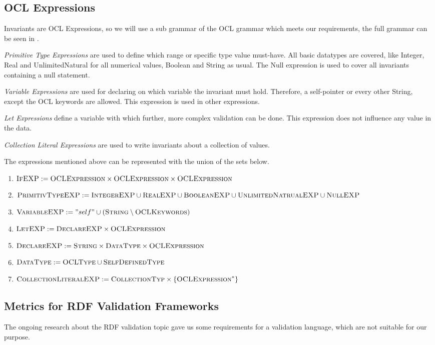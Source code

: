 \documentclass[runningheads]{llncs}
\begin{document}
\subsection{OCL Expressions}\label{OCLINVSubSet}
Invariants are OCL Expressions, so we will use a sub grammar of the OCL grammar which meets our requirements, the full grammar can be seen in \cite{ocl24}.

\textit{Primitive Type Expressions} are used to define which range or specific type value must-have.
All basic datatypes are covered, like Integer, Real and UnlimitedNatural for all numerical values, Boolean and String as usual.
The Null expression is used to cover all invariants containing a null statement.

\textit{Variable Expressions} are used for declaring on which variable the invariant must hold.
Therefore, a self-pointer or every other String, except the OCL keywords are allowed.
This expression is used in other expressions.

\textit{Let Expressions} define a variable with which further, more complex validation can be done.
This expression does not influence any value in the data.

\textit{Collection Literal Expressions} are used to write invariants about a collection of values.

The expressions mentioned above can be represented with the union of the sets below.
\begin{enumerate}
    \item \(\textsc{IfEXP}:=\textsc{OCLExpression} \times \textsc{OCLExpression} \times \textsc{OCLExpression}\)
    \item \(\textsc{PrimitivTypeEXP}:= \textsc{IntegerEXP} \cup \textsc{RealEXP} \cup \textsc{BooleanEXP} \cup \textsc{UnlimitedNatrualEXP} \cup \textsc{NullEXP} \)
    \item \(\textsc{VariableEXP}:="self" \cup (\textsc{String}\setminus\textsc{OCLKeywords})\)
    \item \(\textsc{LetEXP}:=\textsc{DeclareEXP} \times \textsc{OCLExpression}\)
    \item \(\textsc{DeclareEXP}:=\textsc{String} \times \textsc{DataType} \times \textsc{OCLExpression}\)
    \item \(\textsc{DataType}:=\textsc{OCLType} \cup \textsc{SelfDefinedType}\)
    \item \(\textsc{CollectionLiteralEXP}:=\textsc{CollectionTyp}\times\{\textsc{OCLExpression}^*\}\)
\end{enumerate}
\subsection{Metrics for RDF Validation Frameworks}\label{metrics}
The ongoing research about the RDF validation topic gave us some requirements \cite{tomaszuk2017rdf} for a validation language, which are not suitable for our purpose.
\end{document}
